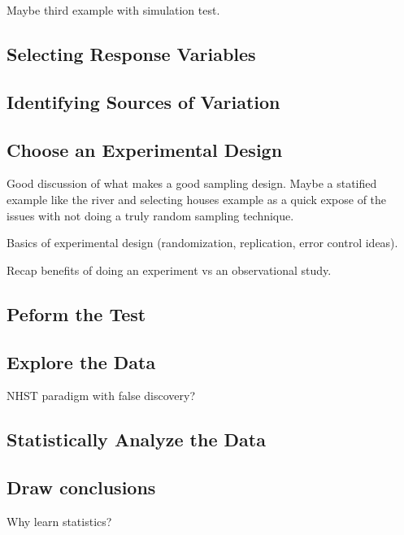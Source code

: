 \documentclass[]{book}
\begin{document}
Maybe third example with simulation test.

\subsection{Selecting Response
Variables}\label{selecting-response-variables-1}

\subsection{Identifying Sources of
Variation}\label{identifying-sources-of-variation-1}

\subsection{Choose an Experimental
Design}\label{choose-an-experimental-design-1}

Good discussion of what makes a good sampling design. Maybe a statified
example like the river and selecting houses example as a quick expose of
the issues with not doing a truly random sampling technique.

Basics of experimental design (randomization, replication, error control
ideas).

Recap benefits of doing an experiment vs an observational study.

\subsection{Peform the Test}\label{peform-the-test-1}

\subsection{Explore the Data}\label{explore-the-data}

NHST paradigm with false discovery?

\subsection{Statistically Analyze the
Data}\label{statistically-analyze-the-data-1}

\subsection{Draw conclusions}\label{draw-conclusions-1}

Why learn statistics?
\end{document}
